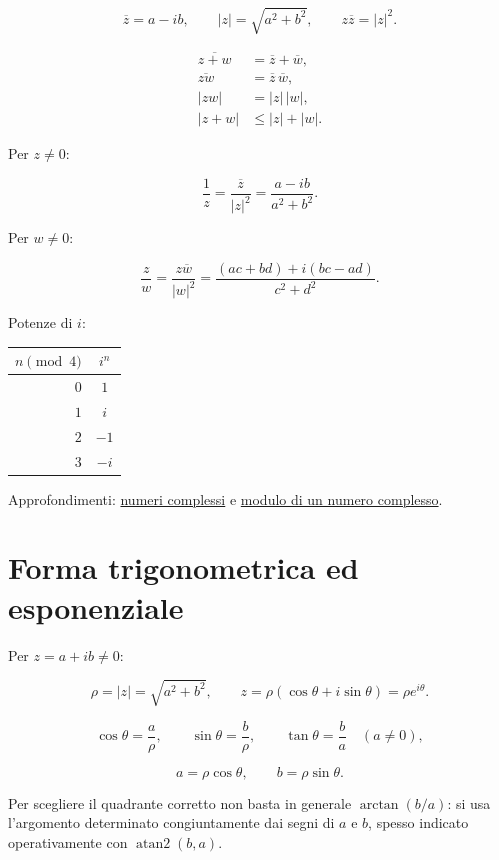 \[
\displaystyle
\overline z=a-ib,
\qquad
|z|=\sqrt{a^2+b^2},
\qquad
z\overline z=|z|^2.
\]

\[
\begin{aligned}
\overline{z+w}&=\overline z+\overline w,\\
\overline{zw}&=\overline z\,\overline w,\\
|zw|&=|z|\,|w|,\\
|z+w|&\le |z|+|w|.
\end{aligned}
\]

Per \(z\ne0\):

\[
\displaystyle
\frac1z=\frac{\overline z}{|z|^2}
=\frac{a-ib}{a^2+b^2}.
\]

Per \(w\ne0\):

\[
\displaystyle
\frac zw
=
\frac{z\overline w}{|w|^2}
=
\frac{(ac+bd)+i(bc-ad)}{c^2+d^2}.
\]

Potenze di \(i\):

\begin{longtable}[]{@{}rc@{}}
\toprule\noalign{}
\(n\pmod 4\) & \(i^n\) \\
\midrule\noalign{}
\endhead
\bottomrule\noalign{}
\endlastfoot
\(0\) & \(1\) \\
\(1\) & \(i\) \\
\(2\) & \(-1\) \\
\(3\) & \(-i\) \\
\end{longtable}

Approfondimenti: \href{https://ingegnerismo.it/matematica/numeri-complessi/}{numeri complessi} e \href{https://ingegnerismo.it/matematica/modulo-numero-complesso/}{modulo di un numero complesso}.

\section{Forma trigonometrica ed esponenziale}\label{forma-trigonometrica-ed-esponenziale}

Per \(z=a+ib\ne0\):

\[
\displaystyle
\rho=|z|=\sqrt{a^2+b^2},
\qquad
z=\rho(\cos\theta+i\sin\theta)=\rho e^{i\theta}.
\]

\[
\displaystyle
\cos\theta=\frac a\rho,
\qquad
\sin\theta=\frac b\rho,
\qquad
\tan\theta=\frac ba\quad(a\ne0),
\]

\[
a=\rho\cos\theta,
\qquad
b=\rho\sin\theta.
\]

Per scegliere il quadrante corretto non basta in generale \(\arctan(b/a)\): si usa l'argomento determinato congiuntamente dai segni di \(a\) e \(b\), spesso indicato operativamente con \(\operatorname{atan2}(b,a)\).

